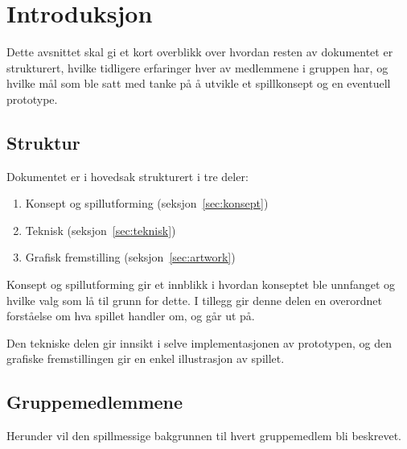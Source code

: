 \section{Introduksjon}\label{sec:intro}
Dette avsnittet skal gi et kort overblikk over hvordan resten av
dokumentet er strukturert, hvilke tidligere erfaringer hver av
medlemmene i gruppen har, og hvilke mål som ble satt med tanke på å
utvikle et spillkonsept og en eventuell prototype.

\subsection{Struktur}
Dokumentet er i hovedsak strukturert i tre deler:
\begin{enumerate}
	\item Konsept og spillutforming (seksjon~\ref{sec:konsept})
	\item Teknisk (seksjon~\ref{sec:teknisk})
	\item Grafisk fremstilling (seksjon~\ref{sec:artwork})
\end{enumerate}
Konsept og spillutforming gir et innblikk i hvordan konseptet ble unnfanget og hvilke
valg som lå til grunn for dette. I tillegg gir denne delen en overordnet
forståelse om hva spillet handler om, og går ut på.

Den tekniske delen gir innsikt i selve implementasjonen av prototypen, og den grafiske fremstillingen
gir en enkel illustrasjon av spillet.

\subsection{Gruppemedlemmene}
Herunder vil den spillmessige bakgrunnen til hvert gruppemedlem bli
beskrevet.

